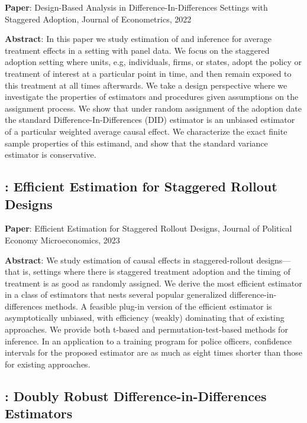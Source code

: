 \documentclass[12pt]{article}
\theoremstyle{definition}
\begin{document}
{\bf Paper}: Design-Based Analysis in Difference-In-Differences Settings with Staggered Adoption, Journal of Econometrics, 2022

{\bf Abstract}: In this paper we study estimation of and inference for average treatment effects in a setting with panel data. We focus on the staggered adoption setting where units, e.g, individuals, firms, or states, adopt the policy or treatment of interest at a particular point in time, and then remain exposed to this treatment at all times afterwards. We take a design perspective where we investigate the properties of estimators and procedures given assumptions on the assignment process. We show that under random assignment of the adoption date the standard Difference-In-Differences (DID) estimator is an unbiased estimator of a particular weighted average causal effect. We characterize the exact finite sample properties of this estimand, and show that the standard variance estimator is conservative.

\subsection{\citet{rothEfficientEstimationStaggered2023}: Efficient Estimation for Staggered Rollout Designs}

{\bf Paper}: Efficient Estimation for Staggered Rollout Designs, Journal of Political Economy Microeconomics, 2023

{\bf Abstract}: We study estimation of causal effects in staggered-rollout designs—that is, settings where there is staggered treatment adoption and the timing of treatment is as good as randomly assigned. We derive the most efficient estimator in a class of estimators that nests several popular generalized difference-in-differences methods. A feasible plug-in version of the efficient estimator is asymptotically unbiased, with efficiency (weakly) dominating that of existing approaches. We provide both t-based and permutation-test-based methods for inference. In an application to a training program for police officers, confidence intervals for the proposed estimator are as much as eight times shorter than those for existing approaches.

\subsection{\citet{santannaDoublyRobustDifferenceinDifferences2020}: Doubly Robust Difference-in-Differences Estimators}
\end{document}
